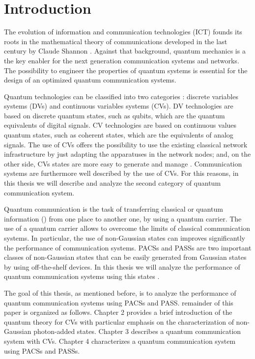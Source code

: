 \chapter{Introduction}
    The evolution of information and communication technologies (ICT) founds its roots in the mathematical
    theory of communications developed in the last century by Claude Shannon \cite{shannon}.
    Against that background, quantum mechanics is a the key enabler for the next generation 
    communication systems and networks.
    The possibility to engineer the properties of quantum systems \cite{helstrom3} is essential for 
    the design of an optimized quantum communication systems.
    
    Quantum technologies can be classified into two categories \cite{tesiGuerrini}: discrete 
    variables systems (DVs) and continuous variables systems (CVs). DV technologies are based
    on discrete quantum states, such as qubits, which are the quantum equivalents of digital
    signals. CV technologies are based on continuous values quantum states, such as 
    coherent states, which are the equivalents of analog signals.
    The use of CVs offers the possibility to use the existing classical network
    infrastructure by just adapting the apparatuses in the network nodes; and, on the other
    side, CVs states are more easy to generate and manage \cite{tesiGuerrini}. Communication
    systems are furthermore well described by the use of CVs. 
    For this reasons, in this thesis we will describe and analyze the second category of quantum
    communication system.

    Quantum communication is the task of transferring classical or quantum information
    (\cite{GueChiWinCon:C20,GueChiWinCon:C19,GueChiCon:C18,ChiConWin:J20}) from one place to another
    one, by using a quantum carrier.
    The use of a quantum carrier allows to overcome the 
    limits of classical communication systems.
    In particular, the use of non-Gaussian states
    can improves significantly the performance of communication systems. 
    PACSs and PASSs are two important classes of non-Gaussian states that can be easily generated 
    from Gaussian states by using off-the-shelf devices. In this thesis we will analyze the 
    performance of quantum communication systems using this states 
    \cite{PACSDisc,GueChiWinCon:C20,GueChiWinCon:C19,GueChiCon:C18}.

    The goal of this thesis, as mentioned before, is to analyze the performance of quantum 
    communication systems using PACSs and PASS. remainder of this paper is organized as follows. 
    Chapter 2 provides a brief introduction of the quantum theory for CVs with particular emphasis on
    the characterization of non-Gaussian photon-added states. Chapter 3 describes a quantum communication 
    system with CVs. Chapter 4 characterizes a quantum communication system using PACSs and PASSs.

